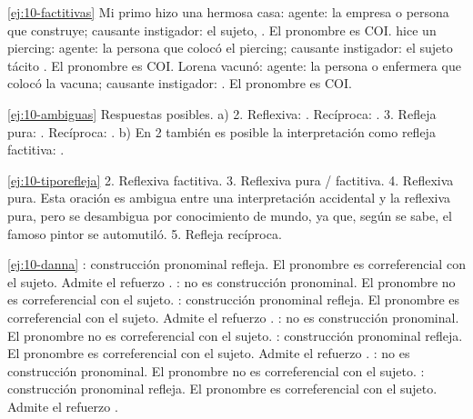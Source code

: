 \begin{solucion}{\ref{ej:10-factitivas}}
Mi primo  hizo una hermosa casa: agente: la empresa o persona que
construye; causante instigador: el sujeto, . El pronombre
 es COI.  hice un piercing: agente: la persona que colocó el
piercing; causante instigador: el sujeto tácito . El pronombre
 es COI. Lorena  vacunó: agente: la persona o enfermera que
colocó la vacuna; causante instigador: . El pronombre 
es COI.
\end{solucion}

\begin{solucion}{\ref{ej:10-ambiguas}}
Respuestas posibles. a) 2. Reflexiva: . Recíproca: . 3. Refleja
pura: . Recíproca: . b) En 2 también es posible la
interpretación como refleja factitiva: .
\end{solucion}

\begin{solucion}{\ref{ej:10-tiporefleja}}
2. Reflexiva factitiva. 3. Reflexiva pura / factitiva. 4. Reflexiva pura. Esta
oración es ambigua entre una interpretación accidental y la reflexiva pura, pero
se desambigua por conocimiento de mundo, ya que, según se sabe, el famoso pintor
se automutiló. 5. Refleja recíproca.
\end{solucion}

\begin{solucion}{\ref{ej:10-danna}}
: construcción pronominal refleja. El pronombre
 es correferencial con el sujeto. Admite el refuerzo . : no es construcción
pronominal. El pronombre  no es correferencial con el sujeto.
: construcción pronominal refleja. El
pronombre  es correferencial con el sujeto. Admite el refuerzo
. : no es construcción pronominal.
El pronombre  no es correferencial con el sujeto. : construcción pronominal refleja. El pronombre  es
correferencial con el sujeto. Admite el refuerzo . : no es construcción pronominal. El pronombre  no es
correferencial con el sujeto. : construcción pronominal refleja. El pronombre  es
correferencial con el sujeto. Admite el refuerzo .
\end{solucion}

